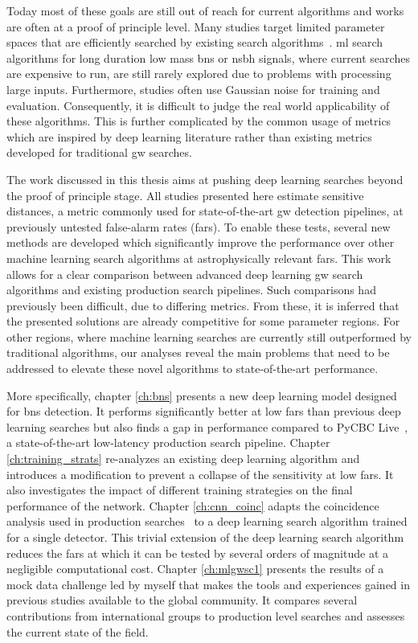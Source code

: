 Today most of these goals are still out of reach for current algorithms and works are often at a proof of principle level. Many studies target limited parameter spaces that are efficiently searched by existing search algorithms~\cite{George:2016hay, Gabbard:2017lja, Wei:2020ztw, Yan:2021wml}. \acrshort{ml} search algorithms for long duration low mass \acrshort{bns} or \acrshort{nsbh} signals, where current searches are expensive to run, are still rarely explored due to problems with processing large inputs. Furthermore, studies often use Gaussian noise for training and evaluation. Consequently, it is difficult to judge the real world applicability of these algorithms. This is further complicated by the common usage of metrics which are inspired by deep learning literature rather than existing metrics developed for traditional \acrshort{gw} searches.

The work discussed in this thesis aims at pushing deep learning searches beyond the proof of principle stage. All studies presented here estimate sensitive distances, a metric commonly used for state-of-the-art \acrshort{gw} detection pipelines, at previously untested false-alarm rates (\acrshort{far}s). To enable these tests, several new methods are developed which significantly improve the performance over other machine learning search algorithms at astrophysically relevant \acrshort{far}s. This work allows for a clear comparison between advanced deep learning \acrshort{gw} search algorithms and existing production search pipelines. Such comparisons had previously been difficult, due to differing metrics. From these, it is inferred that the presented solutions are already competitive for some parameter regions. For other regions, where machine learning searches are currently still outperformed by traditional algorithms, our analyses reveal the main problems that need to be addressed to elevate these novel algorithms to state-of-the-art performance.

More specifically, chapter \ref{ch:bns} presents a new deep learning model designed for \acrshort{bns} detection. It performs significantly better at low \acrshort{far}s than previous deep learning searches but also finds a gap in performance compared to PyCBC Live~\cite{Nitz:2018rgo}, a state-of-the-art low-latency production search pipeline. Chapter \ref{ch:training_strats} re-analyzes an existing deep learning algorithm and introduces a modification to prevent a collapse of the sensitivity at low \acrshort{far}s. It also investigates the impact of different training strategies on the final performance of the network. Chapter \ref{ch:cnn_coinc} adapts the coincidence analysis used in production searches~\cite{Messick:2016aqy, Usman:2015kfa, Klimenko:2015ypf} to a deep learning search algorithm trained for a single detector. This trivial extension of the deep learning search algorithm reduces the \acrshort{far}s at which it can be tested by several orders of magnitude at a negligible computational cost. Chapter \ref{ch:mlgwsc1} presents the results of a mock data challenge led by myself that makes the tools and experiences gained in previous studies available to the global community. It compares several contributions from international groups to production level searches and assesses the current state of the field.
